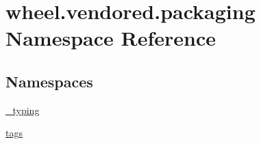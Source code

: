 \hypertarget{namespacewheel_1_1vendored_1_1packaging}{}\section{wheel.\+vendored.\+packaging Namespace Reference}
\label{namespacewheel_1_1vendored_1_1packaging}
\subsection*{Namespaces}
\begin{DoxyCompactItemize}
\item 
 \hyperlink{namespacewheel_1_1vendored_1_1packaging_1_1__typing}{\+\_\+typing}
\item 
 \hyperlink{namespacewheel_1_1vendored_1_1packaging_1_1tags}{tags}
\end{DoxyCompactItemize}
